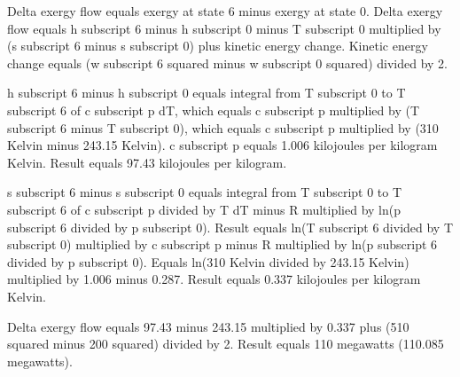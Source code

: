 Delta exergy flow equals exergy at state 6 minus exergy at state 0.  
Delta exergy flow equals h subscript 6 minus h subscript 0 minus T subscript 0 multiplied by (s subscript 6 minus s subscript 0) plus kinetic energy change.  
Kinetic energy change equals (w subscript 6 squared minus w subscript 0 squared) divided by 2.  

h subscript 6 minus h subscript 0 equals integral from T subscript 0 to T subscript 6 of c subscript p dT, which equals c subscript p multiplied by (T subscript 6 minus T subscript 0), which equals c subscript p multiplied by (310 Kelvin minus 243.15 Kelvin).  
c subscript p equals 1.006 kilojoules per kilogram Kelvin.  
Result equals 97.43 kilojoules per kilogram.  

s subscript 6 minus s subscript 0 equals integral from T subscript 0 to T subscript 6 of c subscript p divided by T dT minus R multiplied by ln(p subscript 6 divided by p subscript 0).  
Result equals ln(T subscript 6 divided by T subscript 0) multiplied by c subscript p minus R multiplied by ln(p subscript 6 divided by p subscript 0).  
Equals ln(310 Kelvin divided by 243.15 Kelvin) multiplied by 1.006 minus 0.287.  
Result equals 0.337 kilojoules per kilogram Kelvin.  

Delta exergy flow equals 97.43 minus 243.15 multiplied by 0.337 plus (510 squared minus 200 squared) divided by 2.  
Result equals 110 megawatts (110.085 megawatts).